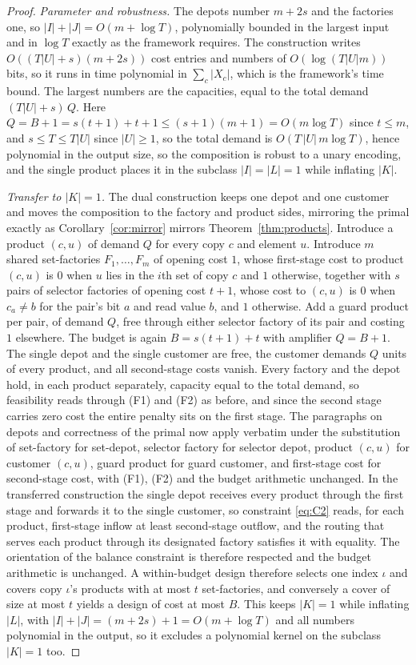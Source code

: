 \begin{proof}
\emph{Parameter and robustness.} The depots number $m+2s$ and the
factories one, so $|I|+|J|=O(m+\log T)$, polynomially bounded in the
largest input and in $\log T$ exactly as the framework requires. The
construction writes $O((T|U|+s)(m+2s))$ cost entries and numbers of
$O(\log(T|U|m))$ bits, so it runs in time polynomial in
$\sum_c\lvert X_c\rvert$, which is the framework's time bound. The
largest numbers are the capacities, equal to the total demand
$(T|U|+s)\,Q$. Here $Q=B+1=s(t+1)+t+1\le(s+1)(m+1)=O(m\log T)$ since
$t\le m$, and $s\le T\le T|U|$ since $|U|\ge 1$, so the total demand is
$O(T\,|U|\,m\log T)$, hence polynomial in the output size,
so the composition is robust to a unary encoding, and the single product
places it in the subclass $|I|=|L|=1$ while inflating $|K|$.

\emph{Transfer to $|K|=1$.} The dual construction keeps one depot and one
customer and moves the composition to the factory and product sides,
mirroring the primal exactly as Corollary~\ref{cor:mirror} mirrors
Theorem~\ref{thm:products}. Introduce a product $(c,u)$ of demand $Q$ for every
copy $c$ and element $u$. Introduce $m$ shared set-factories
$F_1,\dots,F_m$ of opening cost $1$, whose first-stage cost to product
$(c,u)$ is $0$ when $u$ lies in the $i$th set of copy $c$ and $1$
otherwise, together with $s$ pairs of selector factories of opening cost $t+1$,
whose cost to $(c,u)$ is $0$ when $c_a\ne b$ for the pair's bit $a$ and
read value $b$, and $1$ otherwise. Add a guard product per pair, of
demand $Q$, free through either selector factory of its pair and costing
$1$ elsewhere. The budget is again $B=s(t+1)+t$ with amplifier $Q=B+1$.
The single depot and the single customer are free, the
customer demands $Q$ units of every product, and all second-stage costs
vanish. Every factory and the depot hold, in each product separately,
capacity equal to the total demand, so
feasibility reads through (F1) and (F2) as before, and since the second
stage carries zero cost the entire penalty sits on the first stage. The
paragraphs on depots and correctness of the primal now apply verbatim under
the substitution of set-factory for set-depot, selector factory for
selector depot, product $(c,u)$ for customer $(c,u)$, guard product for
guard customer, and first-stage cost for second-stage cost, with (F1),
(F2) and the budget arithmetic unchanged. In the transferred
construction the single depot receives every product through the first
stage and forwards it to the single customer, so constraint \eqref{eq:C2}
reads, for each product, first-stage inflow at least second-stage
outflow, and the routing that serves each product through its designated
factory satisfies it with equality. The orientation of the balance
constraint is therefore respected and the budget arithmetic is
unchanged. A within-budget design
therefore selects one index $\iota$ and covers copy $\iota$'s products
with at most $t$ set-factories, and conversely a cover of size at most
$t$ yields a design of cost at most $B$. This
keeps $|K|=1$ while inflating $|L|$, with $|I|+|J|=(m+2s)+1=O(m+\log T)$
and all numbers polynomial in the output, so it excludes a polynomial
kernel on the subclass $|K|=1$ too.


\end{proof}
